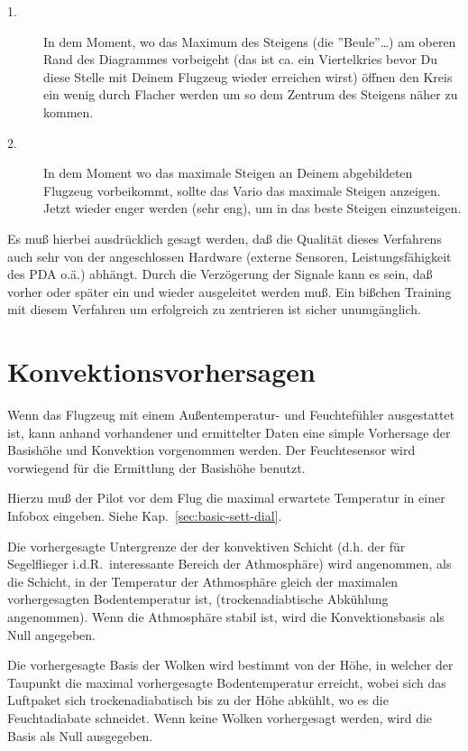 \begin{description}
\item[1.]  In dem Moment, wo das Maximum des Steigens  (die ''Beule''\dots) am  oberen Rand des Diagrammes  vorbeigeht
(das ist ca. ein Viertelkries bevor Du diese Stelle mit Deinem Flugzeug wieder erreichen wirst) öffnen den
Kreis ein wenig durch Flacher werden um so dem Zentrum des Steigens näher zu kommen.
\item[2.]  In dem Moment wo das maximale Steigen an Deinem abgebildeten Flugzeug vorbeikommt,
sollte das Vario das maximale Steigen anzeigen. Jetzt wieder enger werden (sehr eng), um in das
beste Steigen einzusteigen.
\end{description}

Es muß hierbei ausdrücklich gesagt werden, daß die Qualität dieses Verfahrens auch sehr von der
angeschlossen
Hardware (externe Sensoren,  Leistungsfähigkeit des PDA o.ä.) abhängt. Durch die Verzögerung der
Signale kann es sein, daß vorher oder später ein und wieder ausgeleitet werden muß.
Ein bißchen Training mit diesem Verfahren um  erfolgreich zu zentrieren ist sicher unumgänglich.


\section{Konvektionsvorhersagen}\label{sec:convection-forecast}
Wenn das Flugzeug mit einem Außentemperatur- und Feuchtefühler ausgestattet ist, kann anhand
vorhandener und ermittelter Daten  eine simple Vorhersage der Basishöhe und Konvektion vorgenommen werden. Der Feuchtesensor wird vorwiegend für die Ermittlung der Basishöhe benutzt.

Hierzu muß der Pilot vor dem Flug die maximal erwartete Temperatur in einer Infobox eingeben.
 Siehe Kap.~\ref{sec:basic-sett-dial}.

Die vorhergesagte  Untergrenze der der konvektiven Schicht (d.h. der für Segelflieger i.d.R.\ interessante
Bereich der Athmosphäre) wird angenommen, als die Schicht, in der Temperatur der Athmosphäre gleich der maximalen vorhergesagten Bodentemperatur ist, (trockenadiabtische Abkühlung angenommen).
Wenn die Athmosphäre stabil ist, wird die Konvektionsbasis als Null angegeben.

Die vorhergesagte Basis der Wolken wird bestimmt von der Höhe, in welcher der Taupunkt die
maximal vorhergesagte Bodentemperatur erreicht, wobei sich das Luftpaket sich trockenadiabatisch bis
zu der Höhe abkühlt, wo es die Feuchtadiabate schneidet. Wenn keine Wolken vorhergesagt werden, wird die Basis als Null ausgegeben.

